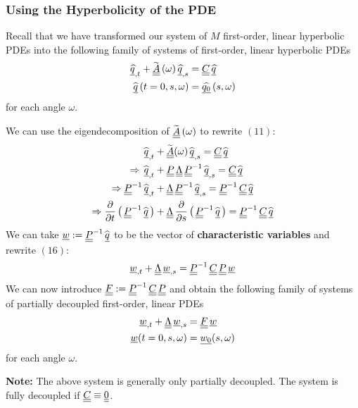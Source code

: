 \subsubsection{Using the Hyperbolicity of the PDE}

Recall that we have transformed our system of $M$ first-order, linear hyperbolic PDEs into the following family of systems of first-order, linear hyperbolic PDEs
\begin{align}
    {\underline{\widehat{q}}}_{,t} + \widetilde{{\underline{\underline{A}}}} \left( \omega \right) {\underline{\widehat{q}}}_{,s} & = {\underline{\underline{C}}}\,{\underline{\widehat{q}}} \\
	\widehat{{\underline{q}}} \left( t = 0, s, \omega \right) & = \widehat{{\underline{q_0}}} \left( s, \omega \right)
\end{align}
for each angle $\omega$.
\par 
We can use the eigendecomposition of $\widetilde{{\underline{\underline{A}}}} \left( \omega \right)$ to rewrite $\left( 11 \right)$:
\begin{align}
    \widehat{{\underline{q}}}_{,t} & + \widetilde{{\underline{\underline{A}}}}(\omega) \, \widehat{{\underline{q}}}_{,s} = {\underline{\underline{C}}} \, \widehat{{\underline{q}}} \\
    \Rightarrow \,  \widehat{{\underline{q}}}_{,t} & + {\underline{\underline{P}}} \, {\underline{\underline{\Lambda}}} \, {\underline{\underline{P}}}^{-1} \, \widehat{{\underline{q}}}_{,s} = {\underline{\underline{C}}} \, \widehat{{\underline{q}}} \\
    \Rightarrow  {\underline{\underline{P}}}^{-1} \,  \widehat{{\underline{q}}}_{,t} & + {\underline{\underline{\Lambda}}} \, {\underline{\underline{P}}}^{-1} \, \widehat{{\underline{q}}}_{,s} = {\underline{\underline{P}}}^{-1} \, {\underline{\underline{C}}} \, \widehat{{\underline{q}}} \\
    \Rightarrow  \frac{\partial}{\partial t}  \left(\, {\underline{\underline{P}}}^{-1} \,   \widehat{{\underline{q}}} \, \right) & + {\underline{\underline{\Lambda}}} \, \frac{\partial}{\partial s} \left(\, {\underline{\underline{P}}}^{-1} \, \widehat{{\underline{q}}} \,\right) = {\underline{\underline{P}}}^{-1} \, {\underline{\underline{C}}} \, \widehat{{\underline{q}}}
\end{align}
We can take ${\underline{w}} := {\underline{\underline{P}}}^{-1} \, \widehat{{\underline{q}}}$ to be the vector of \textbf{characteristic variables} and rewrite $\left( 16 \right)$:
\begin{align*}
    {\underline{w}}_{, t} + {\underline{\underline{\Lambda}}} \, {\underline{w}}_{, s} = {\underline{\underline{P}}}^{-1} \, {\underline{\underline{C}}} \, {\underline{\underline{P}}} \, {\underline{w}}
\end{align*}
We can now introduce ${\underline{\underline{F}}} := {\underline{\underline{P}}}^{-1} \, {\underline{\underline{C}}} \, {\underline{\underline{P}}}$ and obtain the following family of systems of partially decoupled first-order, linear PDEs
\begin{align*}
    {\underline{w}}_{, t} + {\underline{\underline{\Lambda}}} \, {\underline{w}}_{, s} & = {\underline{\underline{F}}} \, {\underline{w}} \\
    {\underline{w}}(t = 0, s, \omega) & = {\underline{w_{0}}}(s, \omega) 
\end{align*}
for each angle $\omega$.
\par
\textbf{Note:} The above system is generally only partially decoupled. 
The system is fully decoupled if ${\underline{\underline{C}}} \equiv {\underline{\underline{0}}}$.

